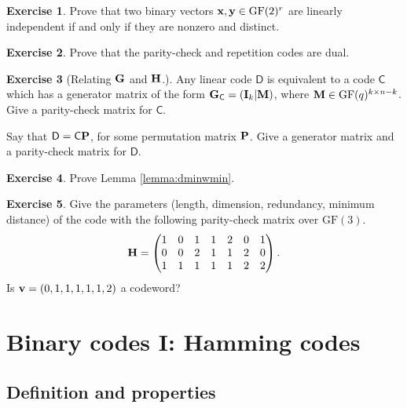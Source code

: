 \documentclass[a4paper, 11pt, openany]{book}
\numberwithin{equation}{section}
\theoremstyle{plain}
\theoremstyle{definition}
\newtheorem{exercise}   {Exercise}  [section]
\newcommand{\GF}{\mathrm{GF}}
\newcommand{\code}[1]{\mathsf{#1}}
\begin{document}
\begin{exercise}
Prove that two binary vectors ${\bf x}, {\bf y} \in \GF(2)^r$ are linearly independent if and only if they are nonzero and distinct.
\end{exercise}

\begin{exercise}
Prove that the parity-check and repetition codes are dual.
\end{exercise}



\begin{exercise}[Relating ${\bf G}$ and ${\bf H}$.] \label{q:GH}
Any linear code $\code{D}$ is equivalent to a code $\code{C}$ which has a generator matrix of the form ${\bf G}_\code{C} = ({\bf I}_k | {\bf M})$, where ${\bf M} \in \GF(q)^{k \times n-k}$. Give a parity-check matrix for $\code{C}$.

Say that $\code{D} = \code{C} {\bf P}$, for some permutation matrix ${\bf P}$. Give a generator matrix and a parity-check matrix for $\code{D}$.
\end{exercise}


\begin{exercise}
Prove Lemma \ref{lemma:dminwmin}.
\end{exercise}



\begin{exercise}
Give the parameters (length, dimension, redundancy, minimum distance) of the code with the following parity-check matrix over $\GF(3)$.
\[
	{\bf H} = \begin{pmatrix}
	1 & 0 & 1 & 1 & 2 & 0 & 1\\
	0 & 0 & 2 & 1 & 1 & 2 & 0\\
	1 & 1 & 1 & 1 & 1 & 2 & 2
	\end{pmatrix}.
\]
Is ${\bf v} = (0,1,1,1,1,1,2)$ a codeword?
\end{exercise}






\section{Binary codes I: Hamming codes}
\label{sec:24}



\subsection{Definition and properties}
\end{document}
